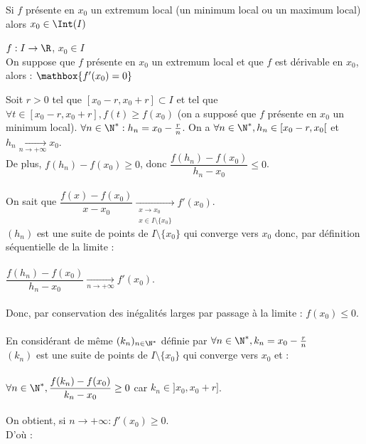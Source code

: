 \documentclass[12pt,a4paper]{report}
\begin{document}

\begin{remarque}
Si $f$ présente en $x_0$ un extremum local (\ie un minimum local ou un maximum local) alors $x_0 \in \Int(I)$
\end{remarque}

\begin{theoreme}{}{}
$f : I \to \R$, $x_0 \in I$\\
On suppose que $f$ présente en $x_0$ un extremum local et que $f$ est dérivable en $x_0$, alors : $\mathbox{f'(x_0)=0}$
\end{theoreme}

\begin{demo}{}
Soit $r>0$ tel que $[x_0-r,x_0+r] \subset I$ et tel que $\forall t \in [x_0-r,x_0+r], f(t) \geq f(x_0)$ (on a supposé que $f$ présente en $x_0$ un minimum local).
$\forall n \in \N^* : h_n = x_0-\frac{r}{n}$. On a $\forall n \in  \N^*, h_n \in [x_0-r,x_0[$ et $h_n \xrightarrow[n \to +\infty]{}x_0$. \\
De plus, $f(h_n) - f(x_0) \geq 0$, donc $\dfrac{f(h_n)-f(x_0)}{h_n - x_0} \leq 0$. \\ \\
On sait que $\dfrac{f(x)-f(x_0)}{x-x_0} \xrightarrow[\substack{x \to x_0 \\ x \in I \setminus \{x_0\}}]{} f'(x_0)$. \\
$(h_n)$ est une suite de points de $I \setminus \{x_0\}$ qui converge vers $x_0$ donc, par définition séquentielle de la limite : \\ \\
$\dfrac{f(h_n)-f(x_0)}{h_n-x_0} \xrightarrow[n \to +\infty]{} f'(x_0)$. \\ \\
Donc, par conservation des inégalités larges par passage à la limite : $f(x_0) \leq 0$. \\ \\
En considérant de même $(k_n)_{n \in \N^*}$ définie par $\forall n \in \N^*, k_n = x_0-\frac{r}{n}$ \\
$(k_n)$ est une suite de points de $I \setminus \{x_0\}$ qui converge vers $x_0$ et : \\ \\
$\forall n \in \N^*, \dfrac{f(k_n)-f(x_0)}{k_n-x_0} \geq 0$ car $k_n \in ]x_0,x_0+r]$. \\ \\
On obtient, si $n \to +\infty : f'(x_0) \geq 0$. \\
D'où : 
\end{demo}
\end{document}
